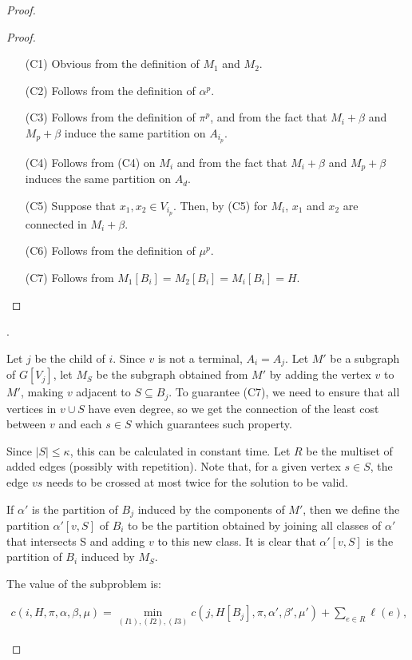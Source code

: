 \begin{proof}
\begin{proof}
\begin{itemize}
    \item[(C1)] Obvious from the definition of \(M_1\) and \(M_2\).
    \item[(C2)] Follows from the definition of \(\alpha^p\).
    \item[(C3)] Follows from the definition of \(\pi^p\), and from the fact that \(M_i + \beta\) and \(M_p + \beta\) induce the same partition on \(A_{i_p}\).
    \item[(C4)] Follows from (C4) on \(M_i\) and from the fact that \(M_i + \beta\) and \(M_p + \beta\) induces the same partition on \(A_d\).
    \item[(C5)] Suppose that \(x_1, x_2 \in V_{i_p}\). Then, by (C5) for \(M_i\), \(x_1 \) and \(x_2\) are connected in \(M_i + \beta\).
    \item[(C6)] Follows from the definition of \(\mu^p\).
    \item[(C7)] Follows from \(M_1[B_i] = M_2[B_i] = M_i[B_i] = H\).
\end{itemize}
\end{proof}

.

\begin{claim}
Let \(j\) be the child of \(i\). Since \(v\) is not a terminal, \(A_i = A_j\). Let \(M'\) be a subgraph of \(G[V_j]\), let \(M_S\) be the subgraph obtained from \(M'\) by adding the vertex \(v\) to \(M'\), making \(v\) adjacent to \(S \subseteq B_j\). To guarantee (C7), we need to ensure that all vertices in \(v \cup S\) have even degree, so we get the connection of the least cost between \(v\) and each \(s \in S\) which guarantees such property.

Since \(|S| \leq \kappa\), this can be calculated in constant time. Let \(R\) be the multiset of added edges (possibly with repetition). Note that, for a given vertex \(s \in S\), the edge \(vs\) needs to be crossed at most twice for the solution to be valid.

If \(\alpha'\) is the partition of \(B_j\) induced by the components of \(M'\), then we define the partition \(\alpha' [v, S]\) of \(B_i\) to be the partition obtained by joining all classes of \(\alpha'\) that intersects S and adding \(v\) to this new class. It is clear that \(\alpha'[v, S]\) is the partition of \(B_i\) induced by \(M_S\).

The value of the subproblem is:

\begin{align*}
c(i, H, \pi, \alpha, \beta, \mu) = \min_{(I1), (I2), (I3)} c(j, H[B_j], \pi, \alpha', \beta', \mu') + \sum_{e \in R}\ell(e),
\end{align*}


\end{claim}
\end{proof}

